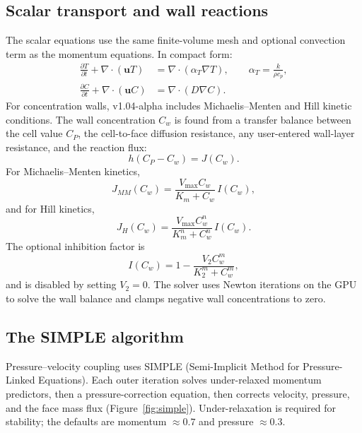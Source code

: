 \documentclass[11pt]{article}
\begin{document}
\subsection{Scalar transport and wall reactions}
The scalar equations use the same finite-volume mesh and optional convection term as
the momentum equations. In compact form:
\begin{align}
\frac{\partial T}{\partial t} + \nabla\cdot(\mathbf{u}T)
  &= \nabla\cdot(\alpha_T\nabla T), \qquad
     \alpha_T = \frac{k}{\rho c_p}, \\
\frac{\partial C}{\partial t} + \nabla\cdot(\mathbf{u}C)
  &= \nabla\cdot(D\nabla C).
\end{align}
For concentration walls, v1.04-alpha includes Michaelis--Menten and Hill kinetic
conditions. The wall concentration \(C_w\) is found from a transfer balance between the
cell value \(C_P\), the cell-to-face diffusion resistance, any user-entered wall-layer
resistance, and the reaction flux:
\begin{equation}
h(C_P - C_w) = J(C_w).
\end{equation}
For Michaelis--Menten kinetics,
\begin{equation}
J_{MM}(C_w)=\frac{V_{\max} C_w}{K_m + C_w}\,I(C_w),
\end{equation}
and for Hill kinetics,
\begin{equation}
J_H(C_w)=\frac{V_{\max} C_w^n}{K_m^n + C_w^n}\,I(C_w).
\end{equation}
The optional inhibition factor is
\begin{equation}
I(C_w)=1-\frac{V_2 C_w^m}{K_2^m + C_w^m},
\end{equation}
and is disabled by setting \(V_2=0\). The solver uses Newton iterations on the GPU to
solve the wall balance and clamps negative wall concentrations to zero.

\subsection{The SIMPLE algorithm}
Pressure--velocity coupling uses SIMPLE (Semi-Implicit Method for Pressure-Linked
Equations). Each outer iteration solves under-relaxed momentum predictors, then a
pressure-correction equation, then corrects velocity, pressure, and the face mass flux
(Figure~\ref{fig:simple}). Under-relaxation is required for stability; the defaults are
momentum \(\approx 0.7\) and pressure \(\approx 0.3\).
\end{document}
